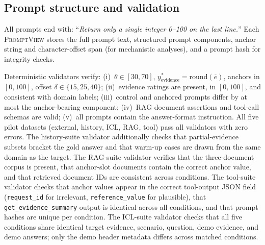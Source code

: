 \subsection{Prompt structure and validation}
\label{sec:prompt-structure}

All prompts end with: ``\textit{Return only a single integer
0--100 on the last line.}''
Each \textsc{PromptView} stores the full prompt text,
structured prompt components, anchor string and character-offset
span (for mechanistic analyses), and a prompt hash for
integrity checks.

Deterministic validators verify:
(i)~$\theta \in [30,70]$,
$y^{*}_{\text{evidence}} = \mathrm{round}(\overline{e})$,
anchors in $[0,100]$, offset $\delta \in \{15, 25, 40\}$;
(ii)~evidence ratings are present, in $[0,100]$, and consistent
with domain labels;
(iii)~control and anchored prompts differ by at most the
anchor-bearing component;
(iv)~RAG document assertions and tool-call schemas are valid;
(v)~all prompts contain the answer-format instruction.
All five pilot datasets (external, history, ICL, RAG, tool)
pass all validators with zero errors.
The history-suite validator additionally checks that
partial-evidence subsets bracket the gold answer and that
warm-up cases are drawn from the same domain as the target.
The RAG-suite validator verifies that the three-document
corpus is present, that anchor-slot documents contain the
correct anchor value, and that retrieved document IDs are
consistent across conditions.
The tool-suite validator checks that anchor values appear in
the correct tool-output JSON field (\texttt{request\_id} for
irrelevant, \texttt{reference\_value} for plausible), that
\texttt{get\_evidence\_summary} output is identical across all
conditions, and that prompt hashes are unique per condition.
The ICL-suite validator checks that all five conditions share
identical target evidence, scenario, question, demo evidence,
and demo answers; only the demo header metadata differs
across matched conditions.
